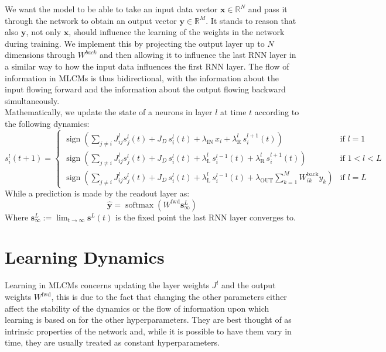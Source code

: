 \documentclass[a4paper,12pt]{report}
\begin{document}
We want the model to be able to take an input data vector $\mathbf{x} \in \mathbb{R}^N$ 
and pass it through the network to obtain an output vector $\mathbf{y} \in 
\mathbb{R}^M$. It stands to reason that also $\mathbf{y}$, not only $\mathbf{x}$, 
should influence the learning of the weights in the network during training. We 
implement this by projecting the output layer up to $N$ dimensions through $W^{back}$ and then allowing 
it to influence the last RNN layer in a similar way to how the input data influences 
the first RNN layer. The flow of information in MLCMs is thus bidirectional, with 
the information about the input flowing forward and the information about the output 
flowing backward simultaneously. \\
Mathematically, we update the state of a neurons in layer $l$ at time $t$ according to the
following dynamics:
\begin{equation}
    s_i^l(t+1) = 
    \begin{cases}
        \operatorname{sign}\left(\displaystyle\sum_{j \neq i} J_{ij}^l s_j^l(t) + 
        J_D\, s_i^l(t) + \lambda_{\mathrm{IN}}\, x_i + \lambda_{\mathrm{R}}^l\, s_i^{l+1}(t)
        \right) & \text{if } l = 1 \\[2ex]
        \operatorname{sign}\left(\displaystyle\sum_{j \neq i} J_{ij}^l s_j^l(t) + 
        J_D\, s_i^l(t) + \lambda_{\mathrm{L}}^l\, s_i^{l-1}(t) + \lambda_{\mathrm{R}}^l\, s_i^{l+1}(t)
        \right) & \text{if } 1 < l < L \\[2ex]
        \operatorname{sign}\left(\displaystyle\sum_{j \neq i} J_{ij}^l s_j^l(t) + 
        J_D\, s_i^l(t) + \lambda_{\mathrm{L}}^l\, s_i^{l-1}(t) + \lambda_{\mathrm{OUT}} 
        \sum_{k=1}^{M} W_{ik}^{\mathrm{back}} y_k\right) & \text{if } l = L
    \end{cases}
    \label{eq:si_update}
\end{equation}
While a prediction is made by the readout layer as:
\begin{equation}
    \hat{\mathbf{y}} = \operatorname{softmax}\left(W^{\mathrm{fwd}} \mathbf{s}^{L}_{\infty}\right)
    \label{eq:yk_update}
\end{equation}
Where $\mathbf{s}^{L}_{\infty} := \lim_{t\to\infty} \mathbf{s}^{L}(t)$ is the fixed 
point the last RNN layer converges to.

\section{Learning Dynamics}
Learning in MLCMs concerns updating the layer weights $J^l$ and the output
weights $W^{\mathrm{fwd}}$, this is due to the fact that changing the other 
parameters either affect the stability of the dynamics or the flow of information 
upon which learning is based on for the other hyperparameters. They are best thought 
of as intrinsic properties of the network and, while it is possible to have them vary 
in time, they are usually treated as constant hyperparameters.
\vspace{0.5em}
\end{document}
